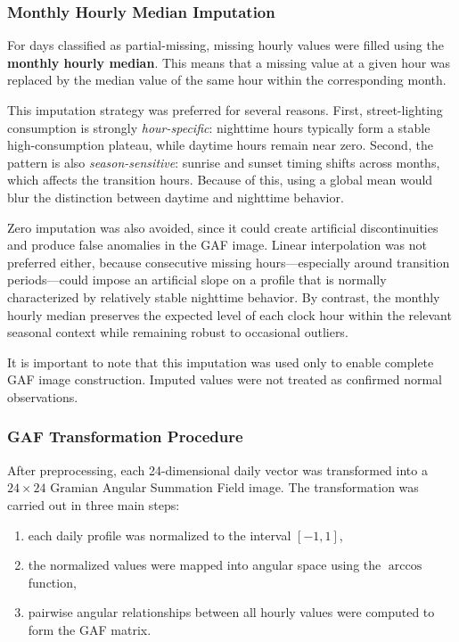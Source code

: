 \documentclass{article}
\begin{document}
\subsubsection{Monthly Hourly Median Imputation}

For days classified as partial-missing, missing hourly values were filled using the \textbf{monthly hourly median}. This means that a missing value at a given hour was replaced by the median value of the same hour within the corresponding month.

This imputation strategy was preferred for several reasons. First, street-lighting consumption is strongly \emph{hour-specific}: nighttime hours typically form a stable high-consumption plateau, while daytime hours remain near zero. Second, the pattern is also \emph{season-sensitive}: sunrise and sunset timing shifts across months, which affects the transition hours. Because of this, using a global mean would blur the distinction between daytime and nighttime behavior.

Zero imputation was also avoided, since it could create artificial discontinuities and produce false anomalies in the GAF image. Linear interpolation was not preferred either, because consecutive missing hours---especially around transition periods---could impose an artificial slope on a profile that is normally characterized by relatively stable nighttime behavior. By contrast, the monthly hourly median preserves the expected level of each clock hour within the relevant seasonal context while remaining robust to occasional outliers.

It is important to note that this imputation was used only to enable complete GAF image construction. Imputed values were not treated as confirmed normal observations.

\subsubsection{GAF Transformation Procedure}

After preprocessing, each 24-dimensional daily vector was transformed into a $24 \times 24$ Gramian Angular Summation Field image. The transformation was carried out in three main steps:

\begin{enumerate}
    \item each daily profile was normalized to the interval $[-1,1]$,
    \item the normalized values were mapped into angular space using the $\arccos$ function,
    \item pairwise angular relationships between all hourly values were computed to form the GAF matrix.
\end{enumerate}
\end{document}

